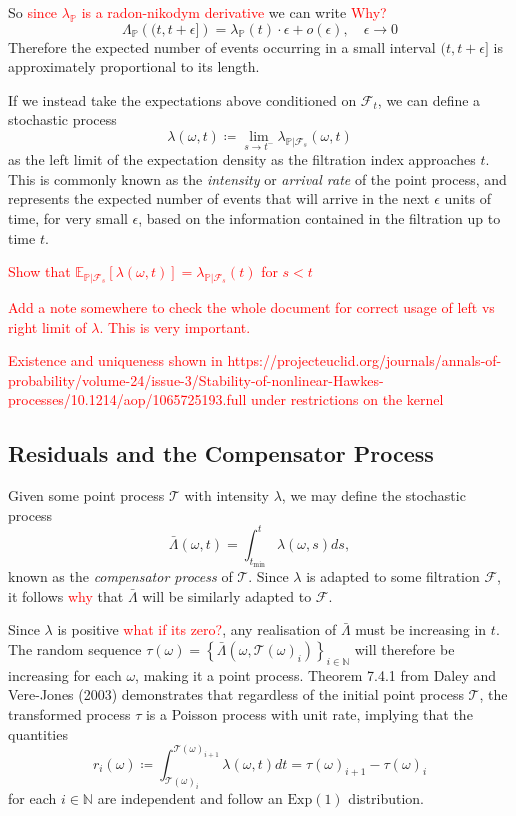 \documentclass[honours,12pt]{unswthesis}
\numberwithin{equation}{section}
\begin{document}
So \textcolor{red}{since $\lambda_\mathbb{P}$ is a radon-nikodym derivative} we can write \textcolor{red}{Why?}
$$\Lambda_{\mathbb{P}}\left((t,t+\epsilon]\right)=\lambda_{\mathbb{P}}(t)\cdot\epsilon+o(\epsilon),\quad \epsilon\to 0$$
Therefore the expected number of events occurring in a small interval $(t,t+\epsilon]$ is approximately proportional to its length.

If we instead take the expectations above conditioned on $\mathcal{F}_t$, we can define a stochastic process
$$\lambda(\omega,t) \coloneq \lim_{s\to t^-}\lambda_{\mathbb{P}\vert\mathcal{F}_s}(\omega,t)$$
as the left limit of the expectation density as the filtration index approaches $t$. This is commonly known as the \textit{intensity} or \textit{arrival rate} of the point process, and represents the expected number of events that will arrive in the next $\epsilon$ units of time, for very small $\epsilon$, based on the information contained in the filtration up to time $t$.

\textcolor{red}{Show that $\mathbb{E}_{\mathbb{P}\vert\mathcal{F}_s}[\lambda(\omega,t)] = \lambda_{\mathbb{P}\vert\mathcal{F}_s}(t)$ for $s<t$}

\textcolor{red}{Add a note somewhere to check the whole document for correct usage of left vs right limit of $\lambda$. This is very important.}

\textcolor{red}{Existence and uniqueness shown in https://projecteuclid.org/journals/annals-of-probability/volume-24/issue-3/Stability-of-nonlinear-Hawkes-processes/10.1214/aop/1065725193.full under restrictions on the kernel}

\subsection{Residuals and the Compensator Process}
Given some point process $\mathcal{T}$ with intensity $\lambda$, we may define the stochastic process
$$\bar\Lambda(\omega,t)=\int_{t_\mathrm{min}}^t \lambda(\omega,s)ds,$$
known as the \textit{compensator process} of $\mathcal{T}$. Since $\lambda$ is adapted to some filtration $\mathcal{F}$, it follows \textcolor{red}{why} that $\bar\Lambda$ will be similarly adapted to $\mathcal{F}$.

Since $\lambda$ is positive \textcolor{red}{what if its zero?}, any realisation of $\bar\Lambda$ must be increasing in $t$. The random sequence $\tau(\omega)=\left\{\bar\Lambda(\omega,\mathcal{T}(\omega)_i)\right\}_{i\in\mathbb{N}}$ will therefore be increasing for each $\omega$, making it a point process. Theorem 7.4.1 from Daley and Vere-Jones (2003) \cite{DaleyVereJones} demonstrates that regardless of the initial point process $\mathcal{T}$, the transformed process $\tau$ is a Poisson process with unit rate, implying that the quantities
$$r_i(\omega)\coloneq \int_{\mathcal{T}(\omega)_i}^{\mathcal{T}(\omega)_{i+1}}\lambda(\omega,t)dt = \tau(\omega)_{i+1}-\tau(\omega)_{i}$$
for each $i\in\mathbb{N}$ are independent and follow an $\mathrm{Exp}(1)$ distribution.
\end{document}

